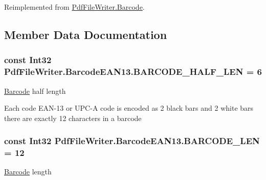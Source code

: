 Reimplemented from \hyperlink{class_pdf_file_writer_1_1_barcode_ae0798dea7667ca7e9c29bd894574bd44}{Pdf\+File\+Writer.\+Barcode}.



\subsection{Member Data Documentation}
\subsubsection[{\texorpdfstring{B\+A\+R\+C\+O\+D\+E\+\_\+\+H\+A\+L\+F\+\_\+\+L\+EN}{BARCODE_HALF_LEN}}]{\setlength{\rightskip}{0pt plus 5cm}const Int32 Pdf\+File\+Writer.\+Barcode\+E\+A\+N13.\+B\+A\+R\+C\+O\+D\+E\+\_\+\+H\+A\+L\+F\+\_\+\+L\+EN = 6}\hypertarget{class_pdf_file_writer_1_1_barcode_e_a_n13_a2f1605acb4691819c667dcef1c696c48}{}\label{class_pdf_file_writer_1_1_barcode_e_a_n13_a2f1605acb4691819c667dcef1c696c48}


\hyperlink{class_pdf_file_writer_1_1_barcode}{Barcode} half length 

Each code E\+A\+N-\/13 or U\+P\+C-\/A code is encoded as 2 black bars and 2 white bars there are exactly 12 characters in a barcode 
\subsubsection[{\texorpdfstring{B\+A\+R\+C\+O\+D\+E\+\_\+\+L\+EN}{BARCODE_LEN}}]{\setlength{\rightskip}{0pt plus 5cm}const Int32 Pdf\+File\+Writer.\+Barcode\+E\+A\+N13.\+B\+A\+R\+C\+O\+D\+E\+\_\+\+L\+EN = 12}\hypertarget{class_pdf_file_writer_1_1_barcode_e_a_n13_ab2ae8a52d9dff5a33b5e8b1d5656c19c}{}\label{class_pdf_file_writer_1_1_barcode_e_a_n13_ab2ae8a52d9dff5a33b5e8b1d5656c19c}


\hyperlink{class_pdf_file_writer_1_1_barcode}{Barcode} length 

